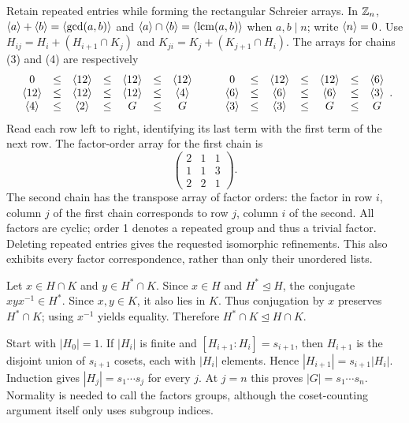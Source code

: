 \idea Retain repeated entries while forming the rectangular Schreier arrays. In $\mathbb{Z}_n$, $\langle a\rangle+\langle b\rangle=\langle \gcd(a,b)\rangle$ and $\langle a\rangle\cap\langle b\rangle=\langle \operatorname{lcm}(a,b)\rangle$ when $a,b\mid n$; write $\langle n\rangle=0$.
Use $H_{ij}=H_i+(H_{i+1}\cap K_j)$ and $K_{ji}=K_j+(K_{j+1}\cap H_i)$. The arrays for chains (3) and (4) are respectively
\[
\begin{array}{ccccccc}
0 &\le& \langle 12\rangle &\le& \langle 12\rangle &\le& \langle 12\rangle\\
\langle 12\rangle &\le& \langle 12\rangle &\le& \langle 12\rangle &\le& \langle 4\rangle\\
\langle 4\rangle &\le& \langle 2\rangle &\le& G &\le& G\end{array}\qquad\begin{array}{ccccccc}
0 &\le& \langle 12\rangle &\le& \langle 12\rangle &\le& \langle 6\rangle\\
\langle 6\rangle &\le& \langle 6\rangle &\le& \langle 6\rangle &\le& \langle 3\rangle\\
\langle 3\rangle &\le& \langle 3\rangle &\le& G &\le& G\end{array}.\]
Read each row left to right, identifying its last term with the first term of the next row. The factor-order array for the first chain is
\[
\begin{pmatrix}2&1&1\\1&1&3\\2&2&1\end{pmatrix}.
\]
The second chain has the transpose array of factor orders: the factor in row $i$, column $j$ of the first chain corresponds to row $j$, column $i$ of the second. All factors are cyclic; order 1 denotes a repeated group and thus a trivial factor. Deleting repeated entries gives the requested isomorphic refinements. This also exhibits every factor correspondence, rather than only their unordered lists.

Let $x\in H\cap K$ and $y\in H^*\cap K$. Since $x\in H$ and $H^*\trianglelefteq H$, the conjugate $xyx^{-1}\in H^*$. Since $x,y\in K$, it also lies in $K$. Thus conjugation by $x$ preserves $H^*\cap K$; using $x^{-1}$ yields equality. Therefore $H^*\cap K\trianglelefteq H\cap K$.

Start with $|H_0|=1$. If $|H_i|$ is finite and $[H_{i+1}:H_i]=s_{i+1}$, then $H_{i+1}$ is the disjoint union of $s_{i+1}$ cosets, each with $|H_i|$ elements. Hence $|H_{i+1}|=s_{i+1}|H_i|$.
Induction gives $|H_j|=s_1\cdots s_j$ for every $j$. At $j=n$ this proves $|G|=s_1\cdots s_n$. Normality is needed to call the factors groups, although the coset-counting argument itself only uses subgroup indices.

